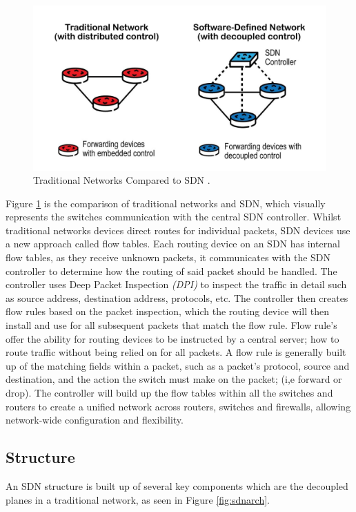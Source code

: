 \documentclass[12pt, oneside]{book}
\begin{document}
\begin{figure}[h]
	\centering
	\includegraphics[scale=0.3]{images/sdnvtrad.jpg}
	\caption{Traditional Networks Compared to SDN \cite{SDNVTradImage2019}.}
	\label{fig:sdnvtrad}
\end{figure}

Figure \ref{fig:sdnvtrad} is the comparison of traditional networks and SDN, which visually
represents the switches communication with the central SDN controller. Whilst traditional networks devices
direct routes for individual packets, SDN devices use a new approach called flow tables.
Each routing device on an SDN has internal flow tables, as they receive unknown packets, it communicates with
the SDN controller 
to determine how the routing of said packet should be handled. The controller uses Deep Packet Inspection \emph{(DPI)}
to inspect the traffic in detail such as source address, destination address, protocols, etc. The controller
then creates flow rules based on the packet inspection, which the routing
device will then 
install and use for all subsequent packets that match the flow rule. Flow rule's offer the ability 
for routing devices to be instructed by 
a central server; how to route traffic without being relied on for all packets. A flow rule is generally built up
of the matching fields within a packet, such as a packet's protocol, source and destination,
and the action the switch must make on the packet; (i,e forward or drop).
 The controller will build up the flow tables within all the switches and routers to create a
unified network across routers, switches and firewalls, allowing network-wide configuration and flexibility\cite{kuzniar2015you}.

\subsection{Structure} %
An SDN structure is built up of several key components which are the decoupled planes in a traditional
network, as seen in Figure \ref{fig:sdnarch}\cite{sdnwebsite2020}.
\end{document}
